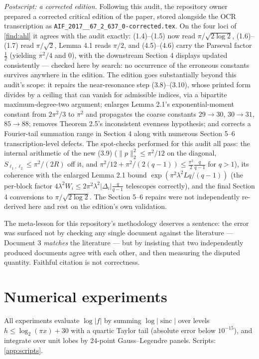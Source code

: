 \documentclass[11pt,oneside]{article}
\theoremstyle{definition}
\theoremstyle{remark}
\newcommand{\sinc}{\operatorname{sinc}}
\begin{document}
\emph{Postscript: a corrected edition.}  Following this audit, the
repository owner prepared a corrected critical edition of the paper,
stored alongside the OCR transcription as
\nolinkurl{AIF_2017__67_2_637_0-corrected.tex}.  On the four loci of
\cref{find:ahl} it agrees with the audit exactly: (1.4)--(1.5) now read
$\pi/\sqrt{2\log2}$, (1.6)--(1.7) read $\pi/\sqrt2$, Lemma 4.1 reads
$\pi/2$, and (4.5)--(4.6) carry the Parseval factor $\tfrac12$
(yielding $\pi^2/4$ and $0$), with the downstream Section 4 displays
updated consistently --- checked here by search: no occurrence of the
erroneous constants survives anywhere in the edition.  The edition goes
substantially beyond this audit's scope: it repairs the near-resonance
step (3.8)--(3.10), whose printed form divides by a ceiling that can
vanish for admissible indices, via a bipartite maximum-degree-two
argument; enlarges Lemma 2.1's exponential-moment constant from
$2\pi^2/3$ to $\pi^2$ and propagates the coarse constants
$29\to30$, $30\to31$, $85\to88$; removes Theorem 2.5's inconsistent
evenness hypothesis; and corrects a Fourier-tail summation range in
Section 4 along with numerous Section 5--6 transcription-level defects.
The spot-checks performed for this audit all pass: the internal
arithmetic of the new (3.9)
($\|p\|_2^2\le\pi^2/12$ on the diagonal, $S_{\ell_1,\ell_2}\le
\pi^2/(2R)$ off it, and
$\pi^2/12+\pi^2/(2(q-1))\le\tfrac{\pi^2}{2}\tfrac{q}{q-1}$ for
$q>1$), its coherence with the enlarged Lemma 2.1 bound
$\exp(\pi^2\lambda^2Lq/(q-1))$ (the per-block factor
$4\lambda^2W_i\le2\pi^2\lambda^2|\Delta_i|\tfrac q{q-1}$ telescopes
correctly), and the final Section 4 conversions to
$\pi/\sqrt{2\log2}$.  The Section 5--6 repairs were not independently
re-derived here and rest on the edition's own validation.

The meta-lesson for this repository's methodology deserves a sentence:
the error was surfaced not by checking any single document against the
literature --- Document 3 \emph{matches} the literature --- but by
insisting that two independently produced documents agree with each
other, and then measuring the disputed quantity.  Faithful citation is
not correctness.

\section{Numerical experiments}
\label{sec:numerics}

All experiments evaluate $\log|f|$ by summing
$\log|{\sinc}|$ over levels $h\le\log_2(\pi x)+30$ with a quartic Taylor
tail (absolute error below $10^{-15}$), and integrate over unit lobes by
24-point Gauss--Legendre panels.  Scripts: \cref{app:scripts}.
\end{document}
